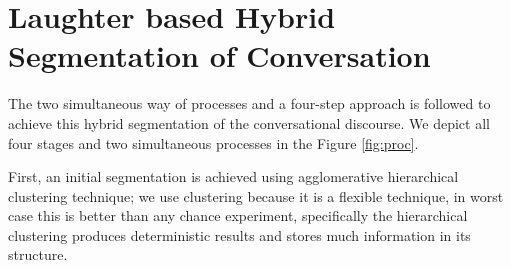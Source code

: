 \documentclass{article}
\begin{document}


\section{Laughter based Hybrid Segmentation of Conversation}\label{sec:hybseg}
The two simultaneous way of processes and a four-step approach is followed to achieve this hybrid segmentation of the conversational discourse. We depict all four stages and two simultaneous processes in the Figure \ref{fig:proc}.

First, an initial segmentation is achieved using agglomerative hierarchical clustering technique; we use clustering because it is a flexible technique, in worst case this is better than any chance experiment, specifically the hierarchical clustering produces deterministic results and stores much information in its structure.%
\end{document}
